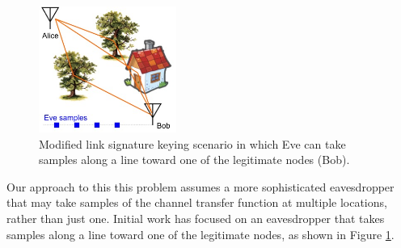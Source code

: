 \documentclass[12pt, titlepage]{article}
\begin{document}
\begin{figure}
\begin{center}
\includegraphics[width=0.4\textwidth]{scenarioEve}
\caption{Modified link signature keying scenario in which Eve can take samples along a line toward one of the legitimate nodes (Bob).}\label{scenarioWithEve}
\end{center}
\end{figure}
Our approach to this this problem assumes a more sophisticated eavesdropper that may take samples of the channel transfer function at multiple locations, rather than just one.  Initial work has focused on an eavesdropper that takes samples along a line toward one of the legitimate nodes, as shown in Figure \ref{scenarioWithEve}.  
\end{document}
